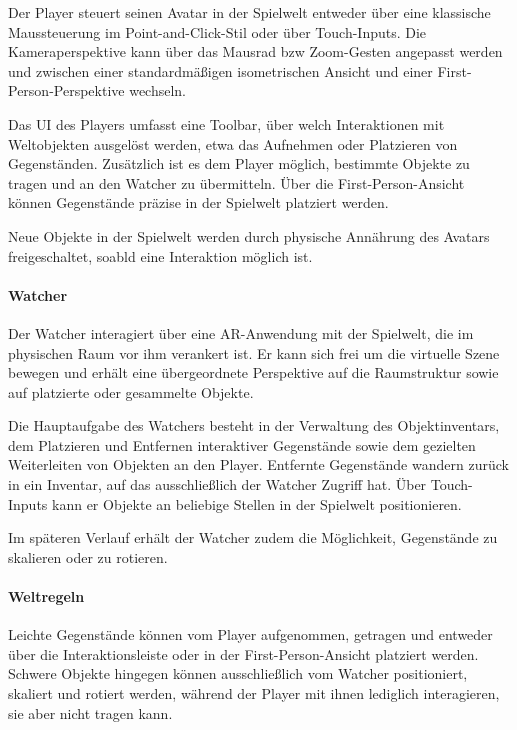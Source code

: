 Der Player steuert seinen Avatar in der Spielwelt entweder über eine klassische Maussteuerung im Point-and-Click-Stil oder über Touch-Inputs. Die Kameraperspektive kann über das Mausrad bzw Zoom-Gesten angepasst werden und zwischen einer standardmäßigen isometrischen Ansicht und einer First-Person-Perspektive wechseln.

Das \ac{UI} des Players umfasst eine Toolbar, über welch Interaktionen mit Weltobjekten ausgelöst werden, etwa das Aufnehmen oder Platzieren von Gegenständen. Zusätzlich ist es dem Player möglich, bestimmte Objekte zu tragen und an den Watcher zu übermitteln. Über die First-Person-Ansicht können Gegenstände präzise in der Spielwelt platziert werden.

Neue Objekte in der Spielwelt werden durch physische Annährung des Avatars freigeschaltet, soabld eine Interaktion möglich ist.

\paragraph{Watcher}

Der Watcher interagiert über eine \ac{AR}-Anwendung mit der Spielwelt, die im physischen Raum vor ihm verankert ist. Er kann sich frei um die virtuelle Szene bewegen und erhält eine übergeordnete Perspektive auf die Raumstruktur sowie auf platzierte oder gesammelte Objekte.

Die Hauptaufgabe des Watchers besteht in der Verwaltung des Objektinventars, dem Platzieren und Entfernen interaktiver Gegenstände sowie dem gezielten Weiterleiten von Objekten an den Player. Entfernte Gegenstände wandern zurück in ein Inventar, auf das ausschließlich der Watcher Zugriff hat. Über Touch-Inputs kann er Objekte an beliebige Stellen in der Spielwelt positionieren.

Im späteren Verlauf erhält der Watcher zudem die Möglichkeit, Gegenstände zu skalieren oder zu rotieren.

\paragraph{Weltregeln}

Leichte Gegenstände können vom Player aufgenommen, getragen und entweder über die Interaktionsleiste oder in der First-Person-Ansicht platziert werden. Schwere Objekte hingegen können ausschließlich vom Watcher positioniert, skaliert und rotiert werden, während der Player mit ihnen lediglich interagieren, sie aber nicht tragen kann. 

